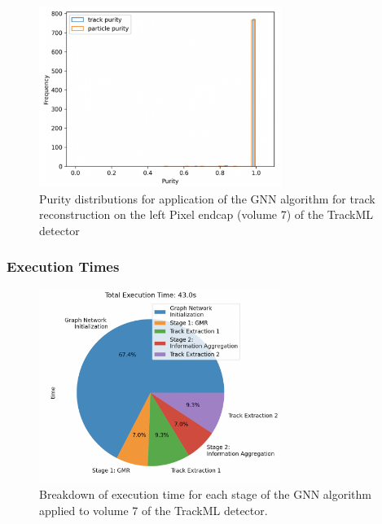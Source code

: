 \begin{figure}[htbp]
    \centering
    \includegraphics[width=0.7\textwidth]{images/7-results/endcap-purity.png}
    \caption{Purity distributions for application of the GNN algorithm for track reconstruction on the left Pixel endcap (volume 7) of the TrackML detector}
    \label{fig:trackml-results-endcap-nodes-purity}%
\end{figure}




\subsubsection{Execution Times}

\begin{figure}[htbp]
    \centering
    \includegraphics[width=0.7\textwidth]{images/7-results/execution-time-endcap-1.png}
    \caption{Breakdown of execution time for each stage of the GNN algorithm applied to volume 7 of the TrackML detector.}
    \label{fig:execution-time-endcap-1}%
\end{figure}





